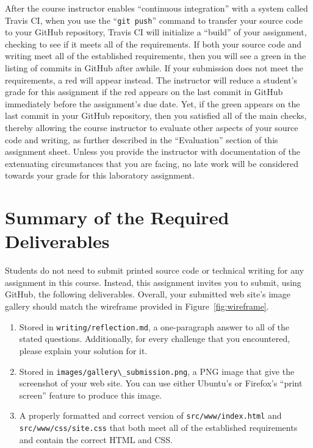 \documentclass[11pt]{article}
\newcommand{\mainprogramsource}{\lstinline{src/www/index.html}}
\newcommand{\secondprogramsource}{\lstinline{src/www/css/site.css}}
\newcommand{\reflection}{\lstinline{writing/reflection.md}}
\newcommand{\screenshot}{\lstinline{images/gallery\_submission.png}}
\newcommand{\gitpush}{\command{git push}}
\newcommand{\command}[1]{``\lstinline{#1}''}
\newcommand{\step}[1]{``{#1}''}
\newcommand{\checkmark}{\ding{51}}
\newcommand{\naughtmark}{\ding{55}}
\begin{document}
After the course instructor enables \step{continuous integration} with a system
called Travis CI, when you use the \gitpush{} command to transfer your source
code to your GitHub repository, Travis CI will initialize a \step{build} of your
assignment, checking to see if it meets all of the requirements. If both your
source code and writing meet all of the established requirements, then you will
see a green \checkmark{} in the listing of commits in GitHub after awhile. If
your submission does not meet the requirements, a red \naughtmark{} will appear
instead. The instructor will reduce a student's grade for this assignment if the
red \naughtmark{} appears on the last commit in GitHub immediately before the
assignment's due date. Yet, if the green \checkmark{} appears on the last commit
in your GitHub repository, then you satisfied all of the main checks, thereby
allowing the course instructor to evaluate other aspects of your source code and
writing, as further described in the \step{Evaluation} section of this
assignment sheet. Unless you provide the instructor with documentation of the
extenuating circumstances that you are facing, no late work will be considered
towards your grade for this laboratory assignment.

\section*{Summary of the Required Deliverables}

\noindent Students do not need to submit printed source code or technical
writing for any assignment in this course. Instead, this assignment invites you
to submit, using GitHub, the following deliverables. Overall, your submitted web
site's image gallery should match the wireframe provided in
Figure~\ref{fig:wireframe}.

\vspace*{-.1in}

\begin{enumerate}

  \setlength{\itemsep}{0in}

\item Stored in \reflection{}, a one-paragraph answer to all of the stated
  questions. Additionally, for every challenge that you encountered, please
  explain your solution for it.

\item Stored in \screenshot{}, a PNG image that give the screenshot of your web
  site. You can use either Ubuntu's or Firefox's ``print screen'' feature to
  produce this image.

\item A properly formatted and correct version of \mainprogramsource{} and
  \secondprogramsource{} that both meet all of the established requirements and
  contain the correct HTML and CSS.

\end{enumerate}
\end{document}
